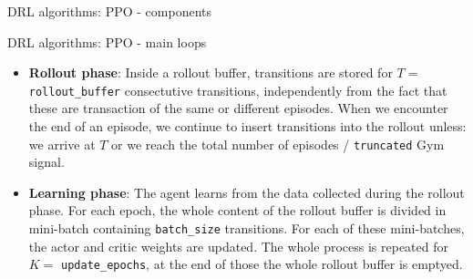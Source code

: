 
\begin{frame}{DRL algorithms: PPO - components}
\end{frame}

\begin{frame}{DRL algorithms: PPO - main loops \parencite{schulman2017ppo}}
  \begin{itemize}
    \item \textbf{Rollout phase}: Inside a rollout buffer, transitions are stored for $T = $ \texttt{rollout\_buffer}
          consectutive transitions, independently from the fact that these are transaction of the same
          or different episodes. When we encounter the end of an episode, we continue to insert transitions
          into the rollout unless: we arrive at $T$ or we reach the total number of episodes / \texttt{truncated} Gym signal.
    \item \textbf{Learning phase}: The agent learns from the data collected during the rollout phase.
          For each epoch, the whole content of the rollout buffer is divided in mini-batch containing
          \texttt{batch\_size} transitions. For each of these mini-batches, the actor and critic weights
          are updated. The whole process is repeated for $K = $ \texttt{update\_epochs}, at the end of
          those the whole rollout buffer is emptyed.
  \end{itemize}

\end{frame}

